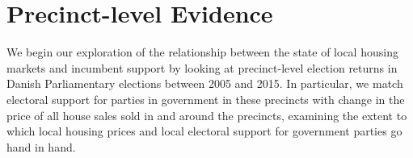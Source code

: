 \documentclass[12pt,a4paper]{article}
\begin{document}





\section{Precinct-level Evidence}
We begin our exploration of the relationship between the state of local housing markets and incumbent support by looking at precinct-level election returns in Danish Parliamentary elections between 2005 and 2015. In particular, we match electoral support for parties in government in these precincts with change in the price of all house sales sold in and around the precincts, examining the extent to which local housing prices and local electoral support for government parties go hand in hand.
\end{document}
